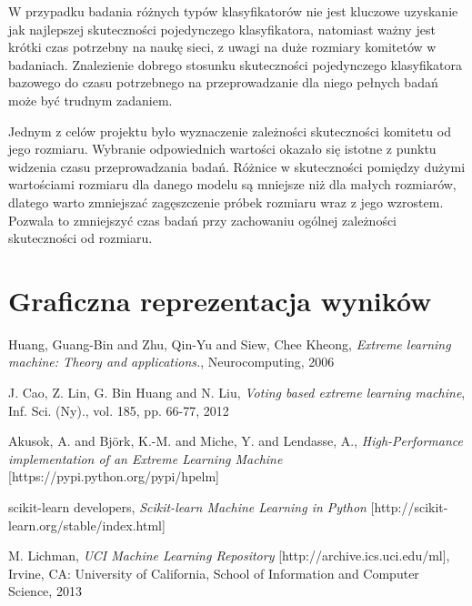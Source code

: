 \documentclass[11pt, a4paper, titlepage]{report}
\begin{document}
W przypadku badania różnych typów klasyfikatorów nie jest kluczowe uzyskanie jak najlepszej skuteczności pojedynczego klasyfikatora, natomiast ważny jest krótki czas potrzebny na naukę sieci, z uwagi na duże rozmiary komitetów w badaniach. Znalezienie dobrego stosunku skuteczności pojedynczego klasyfikatora bazowego do czasu potrzebnego na  przeprowadzanie dla niego pełnych badań może być trudnym zadaniem.

Jednym z celów projektu było wyznaczenie zależności skuteczności komitetu od jego rozmiaru. Wybranie odpowiednich wartości okazało się istotne z punktu widzenia czasu przeprowadzania badań. Różnice w skuteczności pomiędzy dużymi wartościami rozmiaru dla danego modelu są mniejsze niż dla małych rozmiarów, dlatego warto zmniejszać zagęszczenie próbek rozmiaru wraz z jego wzrostem. Pozwala to zmniejszyć czas badań przy zachowaniu ogólnej zależności skuteczności od rozmiaru.

\appendix
\chapter{Graficzna reprezentacja wyników}



\begin{thebibliography}{wojcik}

Huang, Guang-Bin and Zhu, Qin-Yu and Siew, Chee Kheong, \textit{Extreme learning machine: Theory and applications.}, Neurocomputing, 2006

J. Cao, Z. Lin, G. Bin Huang and N. Liu, \textit{Voting based extreme learning machine}, Inf. Sci. (Ny)., vol. 185, pp. 66-77, 2012
	
Akusok, A. and Bj\"{o}rk, K.-M. and Miche, Y. and Lendasse, A., \textit{High-Performance implementation of an Extreme Learning Machine} [https://pypi.python.org/pypi/hpelm]

scikit-learn developers, \textit{Scikit-learn Machine Learning in Python} [http://scikit-learn.org/stable/index.html]

M. Lichman, \textit{UCI Machine Learning Repository} [http://archive.ics.uci.edu/ml], Irvine, CA: University of California, School of Information and Computer Science, 2013
    
\end{thebibliography}
\end{document}
